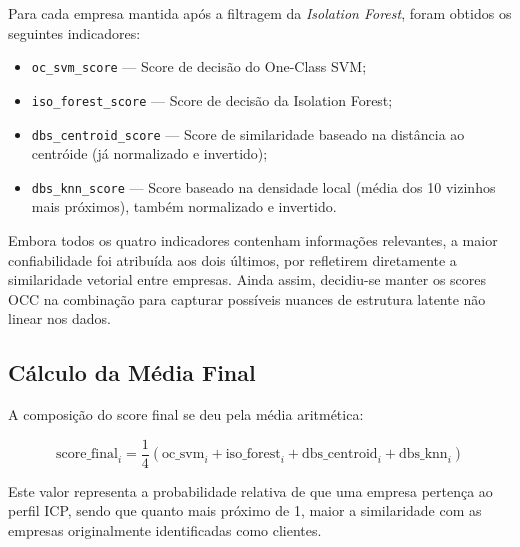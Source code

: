 Para cada empresa mantida após a filtragem da \textit{Isolation Forest}, foram obtidos os seguintes indicadores:
\begin{itemize}
    \item \texttt{oc\_svm\_score} — Score de decisão do One-Class SVM;
    \item \texttt{iso\_forest\_score} — Score de decisão da Isolation Forest;
    \item \texttt{dbs\_centroid\_score} — Score de similaridade baseado na distância ao centróide (já normalizado e invertido);
    \item \texttt{dbs\_knn\_score} — Score baseado na densidade local (média dos 10 vizinhos mais próximos), também normalizado e invertido.
\end{itemize}

Embora todos os quatro indicadores contenham informações relevantes, a maior confiabilidade foi atribuída aos dois últimos, por refletirem diretamente a similaridade vetorial entre empresas. Ainda assim, decidiu-se manter os scores OCC na combinação para capturar possíveis nuances de estrutura latente não linear nos dados.

\subsection{\textbf{Cálculo da Média Final}}

A composição do score final se deu pela média aritmética:

\begin{equation}
\text{score\_final}_i = \frac{1}{4} \left( \text{oc\_svm}_i + \text{iso\_forest}_i + \text{dbs\_centroid}_i + \text{dbs\_knn}_i \right)
\end{equation}

Este valor representa a probabilidade relativa de que uma empresa pertença ao perfil ICP, sendo que quanto mais próximo de 1, maior a similaridade com as empresas originalmente identificadas como clientes.